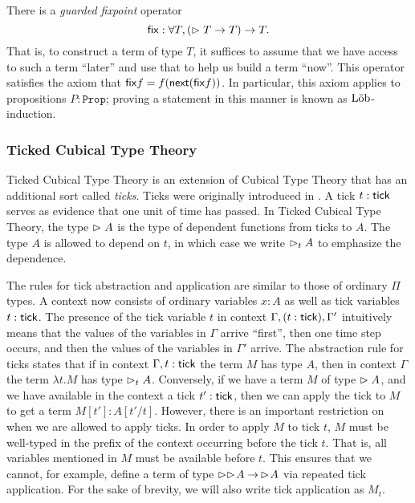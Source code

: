 
There is a \emph{guarded fixpoint} operator
%
\[
  \mathsf{fix} : \forall T, (\vartriangleright T \to T) \to T.
\]
%
That is, to construct a term of type $T$, it suffices to assume that we have
access to such a term ``later'' and use that to help us build a term ``now''.
This operator satisfies the axiom that $\mathsf{fix} f = f (\mathsf{next} (\mathsf{fix} f))$. In
particular, this axiom applies to propositions $P : \texttt{Prop}$; proving a
statement in this manner is known as $\text{L\"{o}b}$-induction.

\subsubsection{Ticked Cubical Type Theory}

Ticked Cubical Type Theory \cite{mogelberg-veltri2019} is an extension of
Cubical Type Theory \cite{CohenCoquandHuberMortberg2017} that has an additional
sort called \emph{ticks}. Ticks were originally introduced in
\cite{bahr-grathwohl-bugge-mogelberg2017}. A tick $t : \mathsf{tick}$ serves as evidence
that one unit of time has passed. In Ticked Cubical Type Theory, the type
$\vartriangleright A$ is the type of dependent functions from ticks to $A$. The type $A$ is
allowed to depend on $t$, in which case we write $\vartriangleright_t A$ to emphasize the
dependence.



The rules for tick abstraction and application are similar to those of ordinary
$\Pi$ types. A context now consists of ordinary variables $x : A$ as well as
tick variables $t : \mathsf{tick}$. The presence of the tick variable $t$ in context
$\Gamma, (t : \mathsf{tick}), \Gamma'$ intuitively means that the values of the
variables in $\Gamma$ arrive ``first'', then one time step occurs, and then the
values of the variables in $\Gamma'$ arrive.
%
The abstraction rule for ticks states that if in context $\Gamma, t : \mathsf{tick}$
the term $M$ has type $A$, then in context $\Gamma$ the term $\lambda t.M$ has
type $\vartriangleright_t A$.
%
Conversely, if we have a term $M$ of type $\vartriangleright A$, and we have available in
the context a tick $t' : \mathsf{tick}$, then we can apply the tick to $M$ to get a
term $M[t'] : A[t'/t]$. However, there is an important restriction on when we
are allowed to apply ticks. In order to apply $M$ to tick $t$, $M$ must be
well-typed in the prefix of the context occurring before the tick $t$. That is,
all variables mentioned in $M$ must be available before $t$. This ensures that
we cannot, for example, define a term of type $\vartriangleright \vartriangleright \hspace{-0.2em} A \to\, \vartriangleright \hspace{-0.2em}
A$ via repeated tick application.
%
For the sake of brevity, we will also write tick application as $M_t$.


